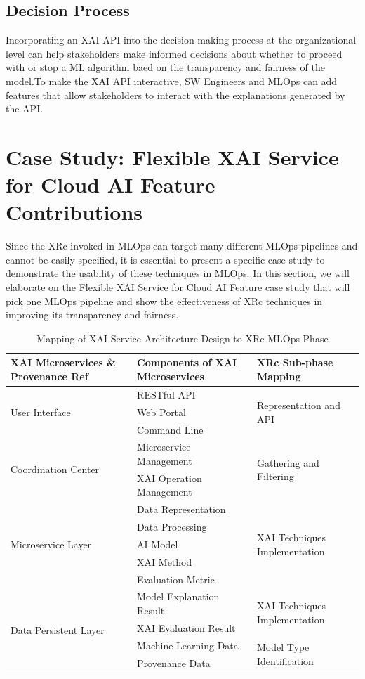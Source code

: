 \documentclass[conference]{IEEEtran}
\begin{document}
\subsection{Decision Process}
Incorporating an XAI API into the decision-making process at the organizational level can help stakeholders make informed decisions about whether to proceed with or stop a ML algorithm baed on the transparency and fairness of the model.To make the XAI API interactive, SW Engineers and MLOps can add features that allow stakeholders to interact with the explanations generated by the API.
\section{Case Study: Flexible XAI Service for Cloud AI Feature Contributions}
Since the XRc invoked in MLOps can target many different MLOps pipelines and cannot be easily specified, it is essential to present a specific case study to demonstrate the usability of these techniques in MLOps. In this section, we will elaborate on the Flexible XAI Service for Cloud AI Feature case study that will pick one MLOps pipeline and show the effectiveness of XRc techniques in improving its transparency and fairness.
\begin{table}[htbp]
\caption{Mapping of XAI Service Architecture Design to XRc MLOps Phase}
\begin{center}
\label{Mapping}
\begin{tabular}{|l|l|l|}
\hline
\textbf{XAI Microservices \& Provenance Ref} & \textbf{Components of XAI Microservices}  & \textbf{XRc Sub-phase Mapping} \\ \hline
\multirow{3}{*}{User Interface} & RESTful API & \multirow{3}{*}{Representation and API} \\
 & Web Portal & \\
 & Command Line & \\ \hline 
\multirow{4}{*}{Coordination Center} & \multirow{2}{*}{Microservice Management} & \multirow{4}{*}{Gathering and Filtering} \\
 & & \\
 & \multirow{2}{*}{XAI Operation Management} & \\
 & & \\ \hline 
\multirow{5}{*}{Microservice Layer} & Data Representation & \multirow{5}{*}{XAI Techniques Implementation} \\
 & Data Processing & \\
 & AI Model & \\
 & XAI Method & \\
 & Evaluation Metric & \\ \hline
\multirow{4}{*}{Data Persistent Layer} & Model Explanation Result & \multirow{2}{*}{XAI Techniques Implementation} \\
 & XAI Evaluation Result & \\ \cline{2-3} 
 & Machine Learning Data & \multirow{2}{*}{Model Type Identification} \\
 & Provenance Data & \\ \hline
\end{tabular}
\end{center}
\end{table}
\end{document}
